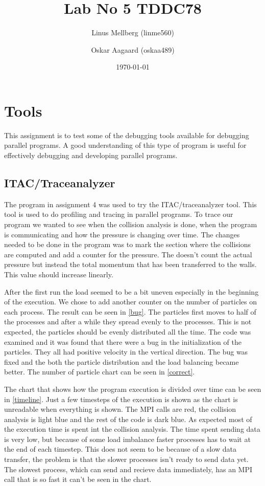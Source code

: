 \documentclass[a4paper,11pt]{article}
\begin{document}
\title{Lab No 5 TDDC78}
\author{Linus Mellberg (linme560) \and Oskar Aagaard (oskaa489)}
\date{\today}
\maketitle
\pagebreak
\thispagestyle{tcr}
\pagestyle{tcr}

\section{Tools}
This assignment is to test some of the debugging tools available for debugging parallel programs.
A good understanding of this type of program is useful for effectively debugging and developing parallel programs.

\subsection{ITAC/Traceanalyzer}
The program in assignment 4 was used to try the ITAC/traceanalyzer tool.
This tool is used to do profiling and tracing in parallel programs.
To trace our program we wanted to see when the collision analysis is done, when the program is communicating and how the pressure is changing over time.
The changes needed to be done in the program was to mark the section where the collisions are computed and add a counter for the pressure.
The doesn't count the actual pressure but instead the total momentum that has been transferred to the walls.
This value should increase linearly.

After the first run the load seemed to be a bit uneven especially in the beginning of the execution.
We chose to add another counter on the number of particles on each process.
The result can be seen in \ref{bug}.
The particles first moves to half of the processes and after a while they spread evenly to the processes.
This is not expected, the particles should be evenly distributed all the time.
The code was examined and it was found that there were a bug in the initialization of the particles.
They all had positive velocity in the vertical direction.
The bug was fixed and the both the particle distribution and the load balancing became better.
The number of particle chart can be seen in \ref{correct}.

The chart that shows how the program execution is divided over time can be seen in \ref{timeline}.
Just a few timesteps of the execution is shown as the chart is unreadable when everything is shown.
The MPI calls are red, the collision analysis is light blue and the rest of the code is dark blue.
As expected most of the execution time is spent int the collision analysis.
The time spent sending data is very low, but because of some load imbalance faster processes has to wait at the end of each timestep.
This does not seem to be because of a slow data transfer, the problem is that the slower processes isn't ready to send data yet.
The slowest process, which can send and recieve data immediately, has an MPI call that is so fast it can't be seen in the chart.
\end{document}
